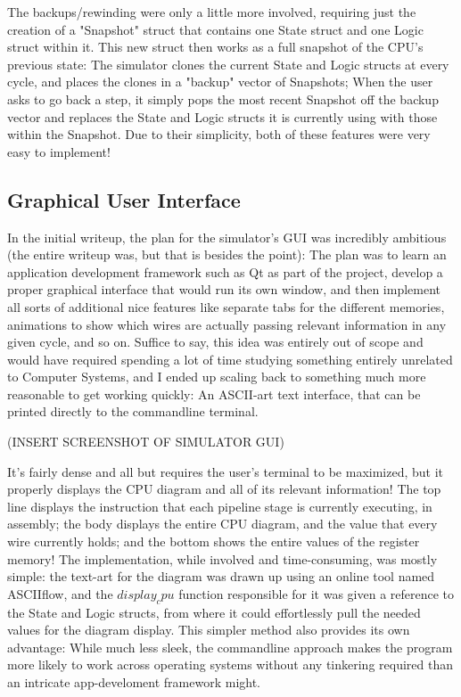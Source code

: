 \documentclass[12pt,twoside]{reedthesis}
\begin{document}
The backups/rewinding were only a little more involved, requiring just the creation of a "Snapshot" struct that contains one State struct and one Logic struct within it. This new struct then works as a full snapshot of the CPU's previous state: The simulator clones the current State and Logic structs at every cycle, and places the clones in a "backup" vector of Snapshots; When the user asks to go back a step, it simply pops the most recent Snapshot off the backup vector and replaces the State and Logic structs it is currently using with those within the Snapshot. Due to their simplicity, both of these features were very easy to implement!

\subsection*{Graphical User Interface}

In the initial writeup, the plan for the simulator's GUI was incredibly ambitious (the entire writeup was, but that is besides the point): The plan was to learn an application development framework such as Qt as part of the project, develop a proper graphical interface that would run its own window, and then implement all sorts of additional nice features like separate tabs for the different memories, animations to show which wires are actually passing relevant information in any given cycle, and so on. Suffice to say, this idea was entirely out of scope and would have required spending a lot of time studying something entirely unrelated to Computer Systems, and I ended up scaling back to something much more reasonable to get working quickly: An ASCII-art text interface, that can be printed directly to the commandline terminal.

(INSERT SCREENSHOT OF SIMULATOR GUI)

It's fairly dense and all but requires the user's terminal to be maximized, but it properly displays the CPU diagram and all of its relevant information! The top line displays the instruction that each pipeline stage is currently executing, in assembly; the body displays the entire CPU diagram, and the value that every wire currently holds; and the bottom shows the entire values of the register memory! The implementation, while involved and time-consuming, was mostly simple: the text-art for the diagram was drawn up using an online tool named ASCIIflow, and the $display_cpu$ function responsible for it was given a reference to the State and Logic structs, from where it could effortlessly pull the needed values for the diagram display. This simpler method also provides its own advantage: While much less sleek, the commandline approach makes the program more likely to work across operating systems without any tinkering required than an intricate app-develoment framework might.
\end{document}
